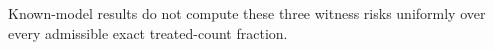 Known-model results do not compute these three witness risks uniformly over every admissible exact treated-count fraction.